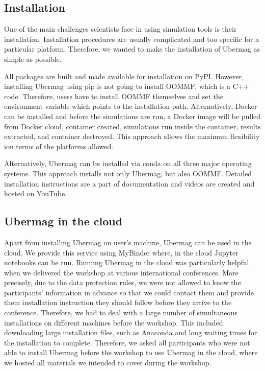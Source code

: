 \documentclass{deliverablereport}
\begin{document}
\subsection{Installation}

One of the main challenges scientists face in using simulation tools
is their installation. Installation procedures are usually complicated
and too specific for a particular platform. Therefore, we wanted to
make the installation of Ubermag as simple as possible.

All packages are built and made available for installation on
PyPI. However, installing Ubermag using pip is not going to install
OOMMF, which is a C++ code. Therefore, users have to install OOMMF
themselves and set the environment variable which points to the
installation path. Alternatively, Docker can be installed and before
the simulations are run, a Docker image will be pulled from Docker
cloud, container created, simulations run inside the container,
results extracted, and container destroyed. This approach allows the
maximum flexibility ion terms of the platforms allowed.

Alternatively, Ubermag can be installed via conda on all three major
operating systems. This approach installs not only Ubermag, but also
OOMMF. Detailed installation instructions are a part of documentation
and videos are created and hosted on YouTube.

\subsection{Ubermag in the cloud}

Apart from installing Ubermag on user's machine, Ubermag can be used
in the cloud. We provide this service using MyBinder where, in the
cloud Jupyter notebooks can be run. Running Ubermag in the cloud was
particularly helpful when we delivered the workshop at various
international conferences. More precisely, due to the data protection
rules, we were not allowed to know the participants' information in
advance so that we could contact them and provide them installation
instruction they should follow before they arrive to the
conference. Therefore, we had to deal with a large number of
simultaneous installations on different machines before the
workshop. This included downloading large installation files, such as
Anaconda and long waiting times for the installation to
complete. Therefore, we asked all participants who were not able to
install Ubermag before the workshop to use Ubermag in the cloud, where
we hosted all materials we intended to cover during the workshop.
\end{document}
